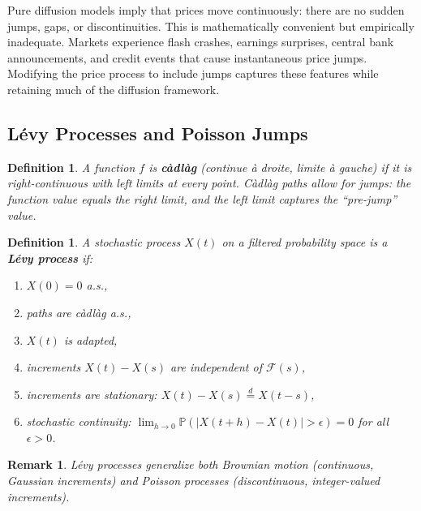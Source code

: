 \documentclass{report}
\theoremstyle{spacedplain}
\theoremstyle{spaceddefinition}
\newtheorem{definition}[theorem]{Definition}
\theoremstyle{spacedremark}
\newtheorem{remark}[theorem]{Remark}
\begin{document}
Pure diffusion models imply that prices move continuously: there are no sudden jumps, gaps, or discontinuities. This is mathematically convenient but empirically inadequate. Markets experience flash crashes, earnings surprises, central bank announcements, and credit events that cause instantaneous price jumps. Modifying the price process to include jumps captures these features while retaining much of the diffusion framework.

\subsection{L\'evy Processes and Poisson Jumps}

\begin{definition}
A function $f$ is \textbf{c\`adl\`ag} (\emph{continue \`a droite, limite \`a gauche}) if it is right-continuous with left limits at every point. C\`adl\`ag paths allow for jumps: the function value equals the right limit, and the left limit captures the ``pre-jump'' value.
\end{definition}

\begin{definition}
A stochastic process $X(t)$ on a filtered probability space is a \textbf{L\'evy process} if:
\begin{enumerate}
    \item $X(0) = 0$ a.s.,
    \item paths are c\`adl\`ag a.s.,
    \item $X(t)$ is adapted,
    \item increments $X(t) - X(s)$ are independent of $\mathcal{F}(s)$,
    \item increments are stationary: $X(t) - X(s) \overset{d}{=} X(t-s)$,
    \item stochastic continuity: $\lim_{h \to 0} \mathbb{P}(|X(t+h) - X(t)| > \epsilon) = 0$ for all $\epsilon > 0$.
\end{enumerate}
\end{definition}

\begin{remark}
L\'evy processes generalize both Brownian motion (continuous, Gaussian increments) and Poisson processes (discontinuous, integer-valued increments).
\end{remark}
\end{document}

